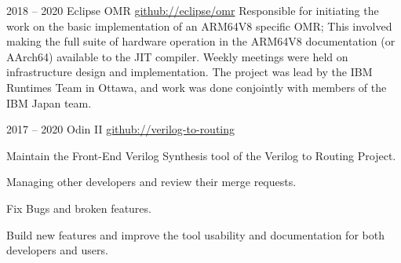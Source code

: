 \documentclass{developercv} %
\begin{document}

\entrys
{2018 -- 2020}
{Eclipse OMR}
{\href{https://github.com/eclipse/omr}{github://eclipse/omr}}{
	Responsible for initiating the work on the basic implementation of an ARM64V8 specific OMR; This involved making the full suite of hardware operation in the ARM64V8 documentation (or AArch64) available to the JIT compiler.
	Weekly meetings were held on infrastructure design and implementation.
	The project was lead by the IBM Runtimes Team in Ottawa, and work was done conjointly with members of the IBM Japan team.
}

\entrys
{2017 -- 2020}
{Odin II}
{\href{https://github.com/verilog-to-routing/vtr-verilog-to-routing/graphs/contributors}{github://verilog-to-routing}}{
	Maintain the Front-End Verilog Synthesis tool of the Verilog to Routing Project.
	\begin{tightemize}
		\item Managing other developers and review their merge requests.
		\item Fix Bugs and broken features.
		\item Build new features and improve the tool usability and documentation for both developers and users.
	\end{tightemize}
}



\vspace*{\baselineskip}


\vspace*{\baselineskip}


\vspace*{\baselineskip}


\vspace*{\baselineskip}

\vspace*{\baselineskip}
\end{document}
